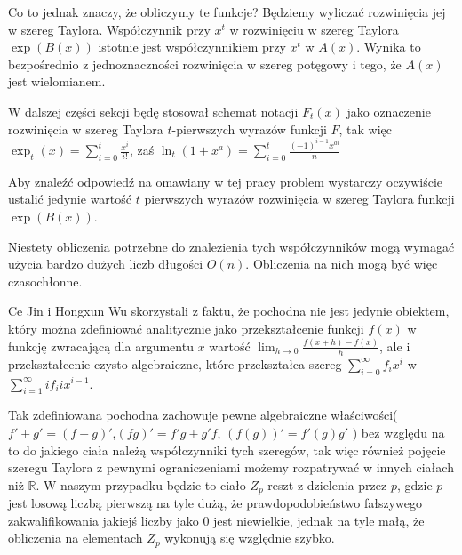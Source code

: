 \documentclass{article}
\begin{document}
Co to jednak znaczy, że obliczymy te funkcje? Będziemy wyliczać rozwinięcia jej w szereg Taylora.
Współczynnik przy $x^t$ w rozwinięciu w szereg Taylora $\exp(B(x))$ istotnie jest współczynnikiem
przy $x^t$ w $A(x)$. Wynika to bezpośrednio z jednoznaczności rozwinięcia w szereg potęgowy i tego, że $A(x)$ jest wielomianem. 

W dalszej części sekcji będę stosował schemat notacji $F_t(x)$ jako oznaczenie rozwinięcia w szereg Taylora 
$t$-pierwszych wyrazów funkcji $F$, tak więc $\exp_t(x) = \sum_{i=0}^t\frac{x^i}{i!}$, zaś 
$\ln_t(1+x^a)=\sum_{i=0}^t\frac{(-1)^{i-1}x^{ai}}{n}$ 

Aby znaleźć odpowiedź na omawiany w tej pracy problem wystarczy oczywiście ustalić jedynie 
wartość $t$ pierwszych wyrazów rozwinięcia w szereg Taylora funkcji $\exp(B(x))$.

Niestety obliczenia potrzebne do znalezienia tych współczynników mogą wymagać użycia bardzo dużych liczb długości $O(n)$. 
Obliczenia na nich mogą być więc czasochłonne. 

Ce Jin i Hongxun Wu skorzystali z faktu, że
pochodna nie jest jedynie obiektem, który można zdefiniować analitycznie jako przekształcenie funkcji 
$f(x)$ w funkcję zwracającą dla argumentu $x$ wartość $\lim_{h \to 0}\frac{f(x+h)-f(x)}{h}$, ale 
i przekształcenie czysto algebraiczne, które przekształca szereg $\sum_{i=0}^{\infty}f_i x^i$ w
$\sum_{i=1}^{\infty}if_{i}ix^{i-1}$. 

Tak zdefiniowana pochodna zachowuje pewne algebraiczne właściwości($f'+g'=(f+g)'$,$(fg)'=f'g+g'f$,
$(f(g))'=f'(g)g'$ ) bez względu na to do jakiego ciała należą współczynniki tych szeregów, tak więc również pojęcie szeregu
Taylora z pewnymi ograniczeniami   możemy rozpatrywać w innych ciałach niż $\mathbb{R}$. W naszym przypadku będzie to ciało 
$Z_p$ reszt z dzielenia przez $p$, gdzie $p$ jest losową liczbą pierwszą na tyle dużą, że prawdopodobieństwo fałszywego zakwalifikowania
jakiejś liczby jako $0$ jest niewielkie, jednak na tyle małą, że obliczenia na elementach $Z_p$ wykonują się względnie szybko.

\end{document}
